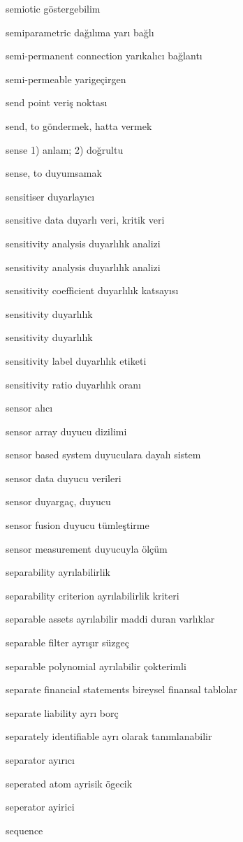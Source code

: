 \documentclass[12pt,fleqn]{article}\usepackage{../../common}
\begin{document}
semiotic göstergebilim

semiparametric dağılıma yarı bağlı

semi-permanent connection yarıkalıcı bağlantı

semi-permeable yarigeçirgen

send point veriş noktası

send, to göndermek, hatta vermek

sense 1) anlam; 2) doğrultu

sense, to duyumsamak

sensitiser duyarlayıcı

sensitive data duyarlı veri, kritik veri

sensitivity analysis duyarlılık analizi

sensitivity analysis duyarlılık analizi

sensitivity coefficient duyarlılık katsayısı

sensitivity duyarlılık

sensitivity duyarlılık

sensitivity label duyarlılık etiketi

sensitivity ratio duyarlılık oranı

sensor alıcı

sensor array duyucu dizilimi

sensor based system duyuculara dayalı sistem

sensor data duyucu verileri

sensor duyargaç, duyucu

sensor fusion duyucu tümleştirme

sensor measurement duyucuyla ölçüm

separability ayrılabilirlik

separability criterion ayrılabilirlik kriteri

separable assets ayrılabilir maddi duran varlıklar

separable filter ayrışır süzgeç

separable polynomial ayrılabilir çokterimli

separate financial statements bireysel finansal tablolar

separate liability ayrı borç

separately identifiable ayrı olarak tanımlanabilir

separator ayırıcı

seperated atom ayrisik ögecik

seperator ayirici

sequence
\end{document}

